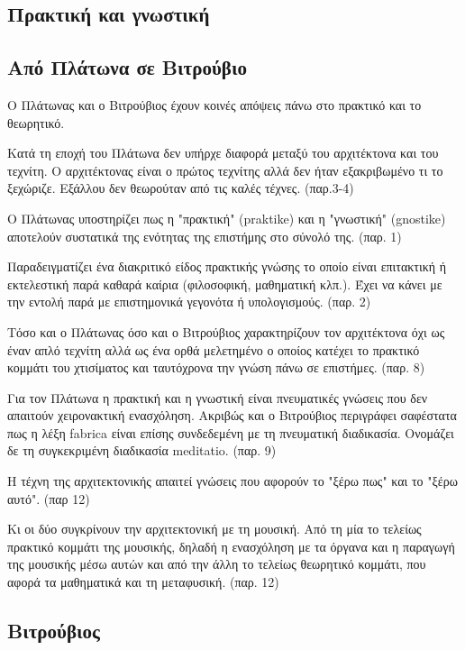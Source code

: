 \subsection{Πρακτική και γνωστική}

\subsection{Από Πλάτωνα σε Βιτρούβιο}

Ο Πλάτωνας και ο Βιτρούβιος έχουν κοινές απόψεις πάνω στο πρακτικό και το
θεωρητικό.

Κατά τη εποχή του Πλάτωνα δεν υπήρχε διαφορά μεταξύ του αρχιτέκτονα και του 
τεχνίτη. Ο αρχιτέκτονας είναι ο πρώτος τεχνίτης αλλά δεν ήταν εξακριβωμένο τι 
το ξεχώριζε. Εξάλλου δεν θεωρούταν από τις καλές τέχνες. (παρ.3-4)

Ο Πλάτωνας υποστηρίζει πως η "πρακτική" (praktike) και η "γνωστική" (gnostike) 
αποτελούν συστατικά της ενότητας της επιστήμης στο σύνολό της. (παρ. 1)

Παραδειγματίζει ένα διακριτικό είδος πρακτικής γνώσης το οποίο είναι επιτακτική
ή εκτελεστική παρά καθαρά καίρια (φιλοσοφική, μαθηματική κλπ.). Έχει να κάνει με
την εντολή παρά με επιστημονικά γεγονότα ή υπολογισμούς. (παρ. 2)

Τόσο και ο Πλάτωνας όσο και ο Βιτρούβιος χαρακτηρίζουν τον αρχιτέκτονα όχι ως 
έναν απλό τεχνίτη αλλά ως ένα ορθά μελετημένο ο οποίος κατέχει το πρακτικό 
κομμάτι του χτισίματος και ταυτόχρονα την γνώση πάνω σε επιστήμες. (παρ. 8)

Για τον Πλάτωνα η πρακτική και η γνωστική είναι πνευματικές γνώσεις που δεν 
απαιτούν χειρονακτική ενασχόληση. Ακριβώς και ο Βιτρούβιος περιγράφει 
σαφέστατα πως η λέξη fabrica είναι επίσης συνδεδεμένη με τη πνευματική 
διαδικασία. Ονομάζει δε τη συγκεκριμένη διαδικασία meditatio. (παρ. 9)

Η τέχνη της αρχιτεκτονικής απαιτεί γνώσεις που αφορούν το "ξέρω πως" και το 
"ξέρω αυτό". (παρ 12)

Κι οι δύο συγκρίνουν την αρχιτεκτονική με τη μουσική. Από τη μία το τελείως 
πρακτικό κομμάτι της μουσικής, δηλαδή η ενασχόληση με τα όργανα και η παραγωγή 
της μουσικής μέσω αυτών και από την άλλη το τελείως θεωρητικό κομμάτι, που 
αφορά τα μαθηματικά και τη μεταφυσική. (παρ. 12)

\subsection{Βιτρούβιος}


